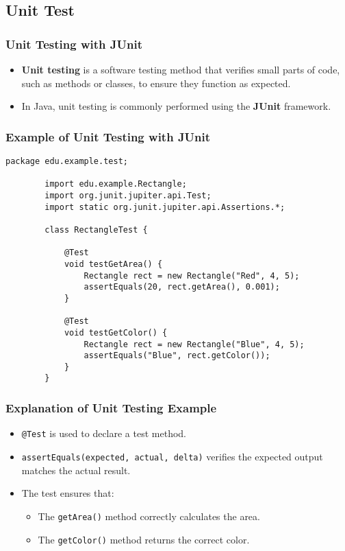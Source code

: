 \documentclass[aspectratio=169, table]{beamer}
\begin{document}
\subsection{Unit Test}
\begin{frame}[fragile]
	\frametitle{Unit Testing with JUnit}
	
	\begin{itemize}
		\item \textbf{Unit testing} is a software testing method that verifies small parts of code, such as methods or classes, to ensure they function as expected.
		\item In Java, unit testing is commonly performed using the \textbf{JUnit} framework.
	\end{itemize}
\end{frame}

\begin{frame}[fragile]
	\frametitle{Example of Unit Testing with JUnit}
	
	\begin{lstlisting}[style=JavaStyle, caption={Unit Testing Example: \texttt{RectangleTest.java}}]
		package edu.example.test;
		
		import edu.example.Rectangle;
		import org.junit.jupiter.api.Test;
		import static org.junit.jupiter.api.Assertions.*;
		
		class RectangleTest {
			
			@Test
			void testGetArea() {
				Rectangle rect = new Rectangle("Red", 4, 5);
				assertEquals(20, rect.getArea(), 0.001);
			}
			
			@Test
			void testGetColor() {
				Rectangle rect = new Rectangle("Blue", 4, 5);
				assertEquals("Blue", rect.getColor());
			}
		}
	\end{lstlisting}
\end{frame}

\begin{frame}[fragile]
	\frametitle{Explanation of Unit Testing Example}
	
	\begin{itemize}
		\item \texttt{@Test} is used to declare a test method.
		\item \texttt{assertEquals(expected, actual, delta)} verifies the expected output matches the actual result.
		\item The test ensures that:
		\begin{itemize}
			\item The \texttt{getArea()} method correctly calculates the area.
			\item The \texttt{getColor()} method returns the correct color.
		\end{itemize}
	\end{itemize}
\end{frame}
\end{document}
